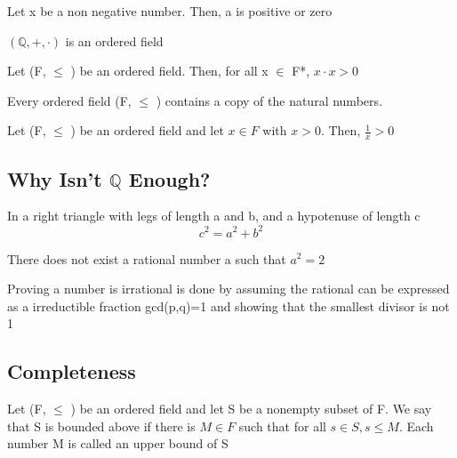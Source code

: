 \documentclass{article}
\begin{document}
\begin{definition}
    Let x be a non negative number. Then, a is positive or zero
\end{definition}

\begin{theorem}
    $ (\mathbb{Q}, +, \cdot) $ is an ordered field
\end{theorem}

\begin{theorem}
    Let (F, $\leq$ ) be an ordered field. Then, for all x $\in$ F*, $ x \cdot x > 0 $
\end{theorem}

\begin{theorem}
    Every ordered field (F, $\leq$ ) contains a copy of the natural numbers.
\end{theorem}

\begin{theorem}
    Let (F, $\leq$ ) be an ordered field and let $ x \in F$ with $ x > 0$.
    Then, $ \frac{1}{x} > 0 $
\end{theorem}

\subsection{Why Isn't $\mathbb{Q}$ Enough?}

\begin{theorem}
    In a right triangle with legs of length a and b, and a hypotenuse of length c
    $$ c^2 = a^2 + b^2 $$
\end{theorem}

\begin{theorem}
    There does not exist a rational number a such that $a^2=2$
\end{theorem}

\begin{remark}
    Proving a number is irrational is done by assuming the rational can be
    expressed as a irreductible fraction gcd(p,q)=1 and showing that the
    smallest divisor is not 1
\end{remark}

\subsection{Completeness}

\begin{definition}
    Let (F, $\leq$ ) be an ordered field and let S be a nonempty subset of F.
    We say that S is bounded above if there is $ M \in F$ such that for all
    $s \in S, s \leq M$. Each number M is called an upper bound of S
\end{definition}
\end{document}
